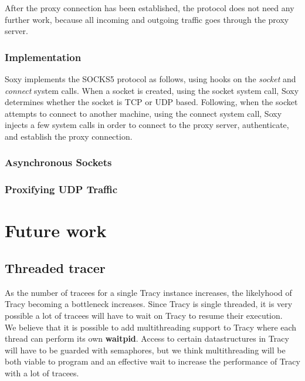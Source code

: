 \documentclass[a4paper, 10pt]{report}
\begin{document}
After the proxy connection has been established, the protocol does not need
any further work, because all incoming and outgoing traffic goes through the
proxy server.

\subsection{Implementation}

Soxy implements the SOCKS5 protocol as follows, using hooks on the
\textit{socket} and \textit{connect} system calls. When a
socket is created, using the socket system call, Soxy determines whether the
socket is TCP or UDP based. Following, when the socket attempts to connect to
another machine, using the connect system call, Soxy injects a few system
calls in order to connect to the proxy server, authenticate, and establish the
proxy connection.

\subsection{Asynchronous Sockets}

\subsection{Proxifying UDP Traffic}

\chapter{Future work}

\section{Threaded tracer}

As the number of tracees for a single Tracy instance increases, the
likelyhood of Tracy becoming a bottleneck increases. Since Tracy is
single threaded, it is very possible a lot of tracees will have to wait
on Tracy to resume their execution. \\

We believe that it is possible to add multithreading support to Tracy where
each thread can perform its own \textbf{waitpid}. Access to certain
datastructures in Tracy will have to be guarded with semaphores, but
we think multithreading will be both viable to program and an effective
wait to increase the performance of Tracy with a lot of tracees.

\end{document}

